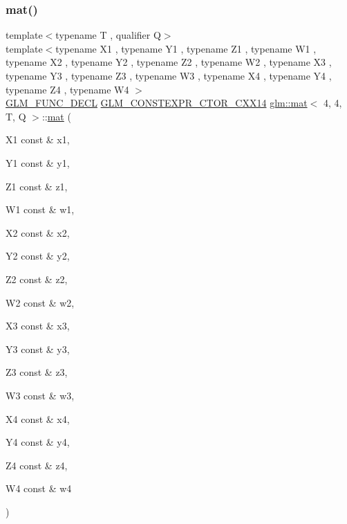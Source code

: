 \subsubsection{\texorpdfstring{mat()}{mat()}\hspace{0.1cm}{\footnotesize\ttfamily [7/21]}}
{\footnotesize\ttfamily template$<$typename T , qualifier Q$>$ \\
template$<$typename X1 , typename Y1 , typename Z1 , typename W1 , typename X2 , typename Y2 , typename Z2 , typename W2 , typename X3 , typename Y3 , typename Z3 , typename W3 , typename X4 , typename Y4 , typename Z4 , typename W4 $>$ \\
\hyperlink{setup_8hpp_ab2d052de21a70539923e9bcbf6e83a51}{G\+L\+M\+\_\+\+F\+U\+N\+C\+\_\+\+D\+E\+CL} \hyperlink{setup_8hpp_a0900f9145e68bf6061b6f5e7be3fa751}{G\+L\+M\+\_\+\+C\+O\+N\+S\+T\+E\+X\+P\+R\+\_\+\+C\+T\+O\+R\+\_\+\+C\+X\+X14} \hyperlink{structglm_1_1mat}{glm\+::mat}$<$ 4, 4, T, Q $>$\+::\hyperlink{structglm_1_1mat}{mat} (\begin{DoxyParamCaption}\item[{X1 const \&}]{x1,  }\item[{Y1 const \&}]{y1,  }\item[{Z1 const \&}]{z1,  }\item[{W1 const \&}]{w1,  }\item[{X2 const \&}]{x2,  }\item[{Y2 const \&}]{y2,  }\item[{Z2 const \&}]{z2,  }\item[{W2 const \&}]{w2,  }\item[{X3 const \&}]{x3,  }\item[{Y3 const \&}]{y3,  }\item[{Z3 const \&}]{z3,  }\item[{W3 const \&}]{w3,  }\item[{X4 const \&}]{x4,  }\item[{Y4 const \&}]{y4,  }\item[{Z4 const \&}]{z4,  }\item[{W4 const \&}]{w4 }\end{DoxyParamCaption})}

\mbox{\label{structglm_1_1mat_3_014_00_014_00_01_t_00_01_q_01_4_a5321c85fc84ae012f0f05976555d00b0}} 
